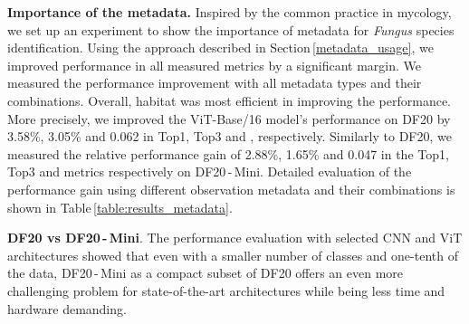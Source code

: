 \documentclass[10pt,twocolumn,letterpaper]{article}
\begin{document}
\textbf{Importance of the metadata.} Inspired by the common practice in mycology, we set up an experiment to show the importance of metadata for \textit{Fungus} species identification. Using the approach described in Section\,\ref{metadata_usage}, we improved performance in all measured metrics by a significant margin. We measured the performance improvement with all metadata types and their combinations. Overall, habitat was most efficient in improving the performance. More precisely, we improved the ViT-Base/16 model's performance on DF20 by 3.58\%, 3.05\% and 0.062 in Top1, Top3 and , respectively. Similarly to DF20, we measured the relative performance gain of 2.88\%, 1.65\% and 0.047 in the Top1, Top3 and  metrics respectively on DF20\,-\,Mini. Detailed evaluation of the performance gain using different observation metadata and their combinations is shown in Table\,\ref{table:results_metadata}.

\textbf{DF20 vs DF20\,-\,Mini}. The performance evaluation with selected CNN and ViT architectures showed that even with a smaller number of classes and one-tenth of the data, DF20\,-\,Mini as a compact subset of DF20 offers an even more challenging problem for state-of-the-art architectures while being less time and hardware demanding.
\end{document}
